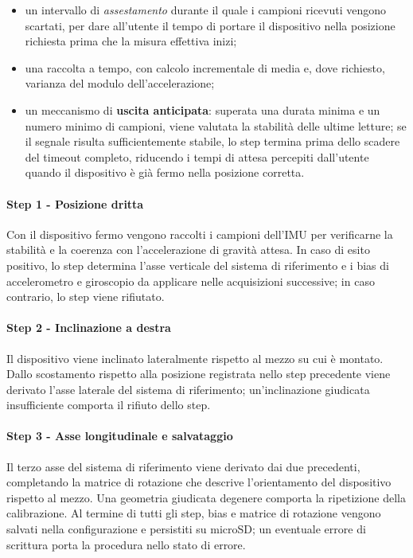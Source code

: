 \begin{itemize}
    \item un intervallo di \emph{assestamento} durante il quale i campioni ricevuti vengono scartati, per dare all'utente il tempo di portare il
    dispositivo nella posizione richiesta prima che la misura effettiva inizi;
    \item una raccolta a tempo, con calcolo incrementale di media e, dove richiesto, varianza del modulo dell'accelerazione;
    \item un meccanismo di \textbf{uscita anticipata}: superata una durata minima e un numero minimo di campioni, viene valutata la stabilità delle
    ultime letture; se il segnale risulta sufficientemente stabile, lo step termina prima dello scadere del timeout completo, riducendo i tempi di
    attesa percepiti dall'utente quando il dispositivo è già fermo nella posizione corretta.
\end{itemize}

\paragraph{Step 1 - Posizione dritta}
Con il dispositivo fermo vengono raccolti i campioni dell'IMU per verificarne la stabilità e la coerenza con l'accelerazione di gravità attesa. 
In caso di esito positivo, lo step determina l'asse verticale del sistema di riferimento e i bias di accelerometro e giroscopio da applicare 
nelle acquisizioni successive; in caso contrario, lo step viene rifiutato.

\paragraph{Step 2 - Inclinazione a destra}
Il dispositivo viene inclinato lateralmente rispetto al mezzo su cui è montato. Dallo scostamento rispetto alla posizione registrata nello step 
precedente viene derivato l'asse laterale del sistema di riferimento; un'inclinazione giudicata insufficiente comporta il rifiuto dello step.

\paragraph{Step 3 - Asse longitudinale e salvataggio}
Il terzo asse del sistema di riferimento viene derivato dai due precedenti, completando la matrice di rotazione che descrive l'orientamento del 
dispositivo rispetto al mezzo. Una geometria giudicata degenere comporta la ripetizione della calibrazione. Al termine di tutti gli step, bias e 
matrice di rotazione vengono salvati nella configurazione e persistiti su microSD; un eventuale errore di scrittura porta la procedura nello 
stato di errore.

